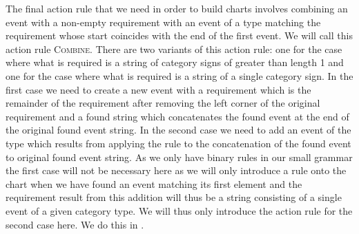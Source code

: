 The final action rule that we need in order to build charts
involves combining an event with a non-empty requirement with an event
of a type matching the requirement whose start coincides with the end
of the first event.  We will call this action rule \textsc{Combine}.
There are two variants of this action rule: one for the case where what is required is a
string of category signs of greater than length 1 and one for the case where what is required
is a string of a single category sign.  In the first case we need to create a new
event with a requirement which is the remainder of the requirement
after removing the left corner of the original requirement and a found
string which concatenates the found event at the end of the original
found event string.  In the second case we need to add an event of the type
which results from applying the rule to the concatenation of the found
event to
original found event string. As we only have binary rules in our small
grammar the first case will not be necessary here as we will only introduce
a rule onto the chart when we have found an event matching its first
element and the requirement result from this addition will thus be a
string consisting of a
single event of a given category type.  We will thus only introduce
the action rule for the second case here.  We do this in \nexteg{}.%

